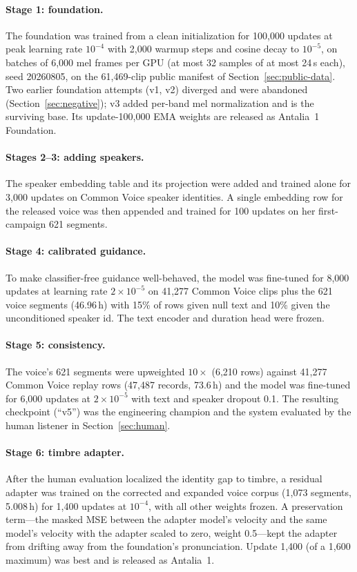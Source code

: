 \documentclass[10pt,twocolumn]{article}
\newcommand{\antalia}{Antalia~1}
\newcommand{\foundation}{Antalia~1 Foundation}
\begin{document}
\paragraph{Stage 1: foundation.} The foundation was trained from a clean initialization for 100,000 updates at peak learning rate $10^{-4}$ with 2,000 warmup steps and cosine decay to $10^{-5}$, on batches of 6,000 mel frames per GPU (at most 32 samples of at most 24\,s each), seed 20260805, on the 61,469-clip public manifest of Section~\ref{sec:public-data}. Two earlier foundation attempts (v1, v2) diverged and were abandoned (Section~\ref{sec:negative}); v3 added per-band mel normalization and is the surviving base. Its update-100,000 EMA weights are released as \foundation.

\paragraph{Stages 2--3: adding speakers.} The speaker embedding table and its projection were added and trained alone for 3,000 updates on Common Voice speaker identities. A single embedding row for the released voice was then appended and trained for 100 updates on her first-campaign 621 segments.

\paragraph{Stage 4: calibrated guidance.} To make classifier-free guidance well-behaved, the model was fine-tuned for 8,000 updates at learning rate $2\times10^{-5}$ on 41,277 Common Voice clips plus the 621 voice segments (46.96\,h) with 15\% of rows given null text and 10\% given the unconditioned speaker id. The text encoder and duration head were frozen.

\paragraph{Stage 5: consistency.} The voice's 621 segments were upweighted $10\times$ (6,210 rows) against 41,277 Common Voice replay rows (47,487 records, 73.6\,h) and the model was fine-tuned for 6,000 updates at $2\times10^{-5}$ with text and speaker dropout 0.1. The resulting checkpoint (``v5'') was the engineering champion and the system evaluated by the human listener in Section~\ref{sec:human}.

\paragraph{Stage 6: timbre adapter.} After the human evaluation localized the identity gap to timbre, a residual adapter was trained on the corrected and expanded voice corpus (1,073 segments, 5.008\,h) for 1,400 updates at $10^{-4}$, with all other weights frozen. A preservation term---the masked MSE between the adapter model's velocity and the same model's velocity with the adapter scaled to zero, weight 0.5---kept the adapter from drifting away from the foundation's pronunciation. Update 1,400 (of a 1,600 maximum) was best and is released as \antalia.
\end{document}
